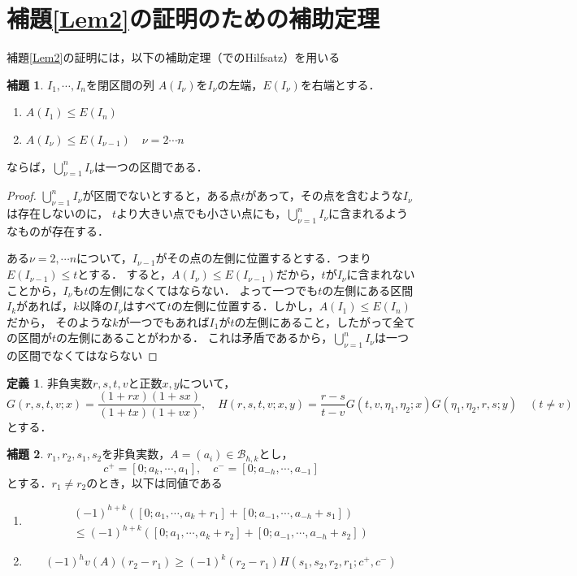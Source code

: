 \documentclass[10pt,a4paper]{ujarticle}
\theoremstyle{definition}
\newtheorem{lemma}{補題}
\newtheorem{definition}{定義}
\begin{document}
\section{補題\ref{Lem2}の証明のための補助定理}
補題\ref{Lem2}の証明には，以下の補助定理（\cite{schecker}でのHilfsatz）を用いる
\begin{lemma}
  \label{Hilfsatz1}
  $I_1,\cdots, I_n$を閉区間の列
  $A(I_\nu)$を$I_\nu$の左端，$E(I_\nu)$を右端とする．
  \begin{enumerate}
    \item $A(I_1) \le E(I_n)$
    \item $A(I_\nu) \le E(I_{\nu - 1}) \quad \nu = 2\cdots n$
  \end{enumerate}
  ならば，$\bigcup_{\nu = 1}^n I_\nu$は一つの区間である．
\end{lemma}
\begin{proof}
  $\bigcup_{\nu = 1}^n I_\nu$が区間でないとすると，ある点$t$があって，その点を含むような$I_\nu$は存在しないのに，
  $t$より大きい点でも小さい点にも，$\bigcup_{\nu = 1}^n I_\nu$に含まれるようなものが存在する．

  ある$\nu = 2,\cdots n$について，$I_{\nu - 1}$がその点の左側に位置するとする．つまり$E(I_{\nu - 1})\le t$とする．
  すると，$A(I_\nu) \le E(I_{\nu - 1})$だから，$t$が$I_\nu$に含まれないことから，$I_\nu$も$t$の左側になくてはならない．
  よって一つでも$t$の左側にある区間$I_k$があれば，$k$以降の$I_\nu$はすべて$t$の左側に位置する．しかし，$A(I_1)\le E(I_n)$だから，
  そのような$k$が一つでもあれば$I_1$が$t$の左側にあること，したがって全ての区間が$t$の左側にあることがわかる．
  これは矛盾であるから，$\bigcup_{\nu = 1}^n I_\nu$は一つの区間でなくてはならない
\end{proof}
\begin{definition}
  非負実数$r,s,t,v$と正数$x,y$について，
  \[
  G(r,s,t,v; x) = \frac{(1 + rx)(1 + sx)}{(1 + tx)(1 + vx)}, \quad 
  H(r, s, t, v; x, y) = \frac{r - s}{t - v}G(t,v,\eta_1, \eta_2; x)G(\eta_1, \eta_2, r, s; y)\quad (t\neq v)
  \]
  とする．
\end{definition}
\begin{lemma}
  \label{Hilfsatz2}
  $r_1, r_2, s_1, s_2$を非負実数，$A = (a_i) \in \mathcal{B}_{h,k}$とし，
  \[
  c^+ = [0;a_k,\cdots, a_1], \quad c^- = [0; a_{-h},\cdots, a_{-1}]
  \]
  とする．$r_1\neq r_2$のとき，以下は同値である
  \begin{enumerate}
    \item \begin{align*}
      (-1)^{h + k} ([0; a_1,\cdots , a_k + r_1] + [0; a_{-1}, \cdots, a_{-h} + s_1]) \\
      \le (-1)^{h + k} ([0; a_1,\cdots , a_k + r_2] + [0; a_{-1}, \cdots, a_{-h} + s_2])
    \end{align*}
    
    \item 
    \[
    (-1)^{h} v(A) (r_2 - r_1) \ge (-1)^k (r_2 - r_1) H(s_1, s_2, r_2, r_1; c^+ , c^-)
    \]
  \end{enumerate}
\end{lemma}
\end{document}
